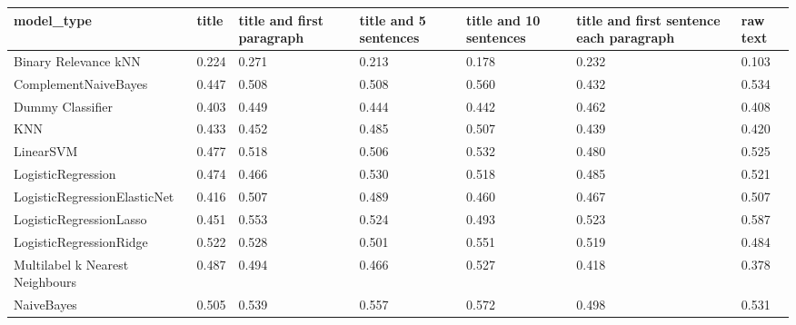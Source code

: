 \begin{tabular}{lllllll}
\toprule
                     model\_type & title & title and first paragraph & title and 5 sentences & title and 10 sentences & title and first sentence each paragraph &  raw text \\
\midrule
           Binary Relevance kNN & 0.224 &                     0.271 &                 0.213 &                  0.178 &                                   0.232 &     0.103 \\
           ComplementNaiveBayes & 0.447 &                     0.508 &                 0.508 &                  0.560 &                                   0.432 &     0.534 \\
               Dummy Classifier & 0.403 &                     0.449 &                 0.444 &                  0.442 &                                   0.462 &     0.408 \\
                            KNN & 0.433 &                     0.452 &                 0.485 &                  0.507 &                                   0.439 &     0.420 \\
                      LinearSVM & 0.477 &                     0.518 &                 0.506 &                  0.532 &                                   0.480 &     0.525 \\
             LogisticRegression & 0.474 &                     0.466 &                 0.530 &                  0.518 &                                   0.485 &     0.521 \\
   LogisticRegressionElasticNet & 0.416 &                     0.507 &                 0.489 &                  0.460 &                                   0.467 &     0.507 \\
        LogisticRegressionLasso & 0.451 &                     0.553 &                 0.524 &                  0.493 &                                   0.523 &     0.587 \\
        LogisticRegressionRidge & 0.522 &                     0.528 &                 0.501 &                  0.551 &                                   0.519 &     0.484 \\
Multilabel k Nearest Neighbours & 0.487 &                     0.494 &                 0.466 &                  0.527 &                                   0.418 &     0.378 \\
                     NaiveBayes & 0.505 &                     0.539 &                 0.557 &                  0.572 &                                   0.498 &     0.531 \\

\end{tabular}

